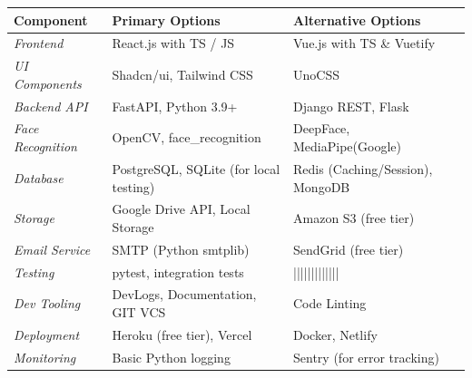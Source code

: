 \documentclass[a4paper,12pt]{article}
\begin{document}
\begin{table}[h]
\centering
\renewcommand{\arraystretch}{1.5}
\begin{tabular}{|p{}|p{}|p{}|}
\hline
\textbf{Component} & \textbf{Primary Options} & \textbf{Alternative Options} \\
\hline\hline

\multirow{1}{*}{\textit{Frontend}} & 
React.js with TS / JS & 
Vue.js with TS \& Vuetify \\
\hline

\multirow{1}{*}{\textit{UI Components}} & 
Shadcn/ui, Tailwind CSS & 
UnoCSS \\
\hline

\multirow{1}{*}{\textit{Backend API}} & 
FastAPI, Python 3.9+ & 
Django REST, Flask \\
\hline

\multirow{1}{*}{\textit{Face Recognition}} & 
OpenCV, face\_recognition & 
DeepFace, MediaPipe(Google) \\
\hline

\multirow{1}{*}{\textit{Database}} & 
PostgreSQL, SQLite (for local testing) & 
Redis (Caching/Session), MongoDB \\
\hline

\multirow{1}{*}{\textit{Storage}} & 
Google Drive API, Local Storage & 
Amazon S3 (free tier) \\
\hline

\multirow{1}{*}{\textit{Email Service}} & 
SMTP (Python smtplib) & SendGrid (free tier) \\
\hline

\multirow{1}{*}{\textit{Testing}} &
pytest, integration tests & ||||||||||||| \\
\hline

\multirow{1}{*}{\textit{Dev Tooling}} &
DevLogs, Documentation, GIT VCS & Code Linting \\
\hline

\multirow{1}{*}{\textit{Deployment}} & 
Heroku (free tier), Vercel & 
Docker, Netlify \\
\hline

\multirow{1}{*}{\textit{Monitoring}} & 
Basic Python logging & 
Sentry (for error tracking) \\
\hline
\end{tabular}
\end{table}

\newpage
\end{document}
